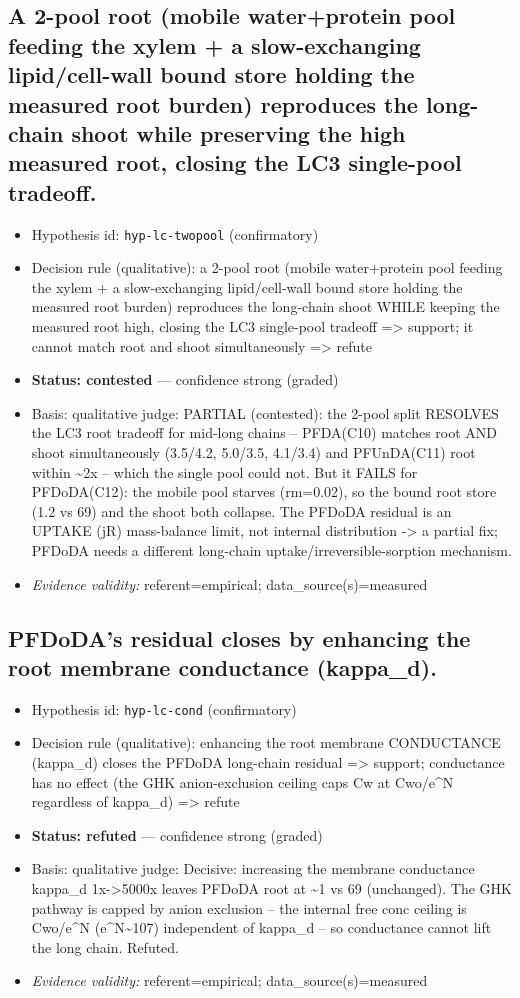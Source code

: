 \documentclass{article}
\begin{document}
\subsection{A 2-pool root (mobile water+protein pool feeding the xylem + a slow-exchanging lipid/cell-wall bound store holding the measured root burden) reproduces the long-chain shoot while preserving the high measured root, closing the LC3 single-pool tradeoff.}
\begin{itemize}
  \item Hypothesis id: \texttt{hyp-lc-twopool} (confirmatory)
  \item Decision rule (qualitative): a 2-pool root (mobile water+protein pool feeding the xylem + a slow-exchanging lipid/cell-wall bound store holding the measured root burden) reproduces the long-chain shoot WHILE keeping the measured root high, closing the LC3 single-pool tradeoff => support; it cannot match root and shoot simultaneously => refute
  \item \textbf{Status: contested} --- confidence strong (graded)
  \item Basis: qualitative judge: PARTIAL (contested): the 2-pool split RESOLVES the LC3 root tradeoff for mid-long chains -- PFDA(C10) matches root AND shoot simultaneously (3.5/4.2, 5.0/3.5, 4.1/3.4) and PFUnDA(C11) root within \textasciitilde{}2x -- which the single pool could not. But it FAILS for PFDoDA(C12): the mobile pool starves (rm=0.02), so the bound root store (1.2 vs 69) and the shoot both collapse. The PFDoDA residual is an UPTAKE (jR) mass-balance limit, not internal distribution -> a partial fix; PFDoDA needs a different long-chain uptake/irreversible-sorption mechanism.
  \item \textit{Evidence validity:} referent=empirical; data\_source(s)=measured
\end{itemize}

\subsection{PFDoDA's residual closes by enhancing the root membrane conductance (kappa\_d).}
\begin{itemize}
  \item Hypothesis id: \texttt{hyp-lc-cond} (confirmatory)
  \item Decision rule (qualitative): enhancing the root membrane CONDUCTANCE (kappa\_d) closes the PFDoDA long-chain residual => support; conductance has no effect (the GHK anion-exclusion ceiling caps Cw at Cwo/e\textasciicircum{}N regardless of kappa\_d) => refute
  \item \textbf{Status: refuted} --- confidence strong (graded)
  \item Basis: qualitative judge: Decisive: increasing the membrane conductance kappa\_d 1x->5000x leaves PFDoDA root at \textasciitilde{}1 vs 69 (unchanged). The GHK pathway is capped by anion exclusion -- the internal free conc ceiling is Cwo/e\textasciicircum{}N (e\textasciicircum{}N\textasciitilde{}107) independent of kappa\_d -- so conductance cannot lift the long chain. Refuted.
  \item \textit{Evidence validity:} referent=empirical; data\_source(s)=measured
\end{itemize}
\end{document}
